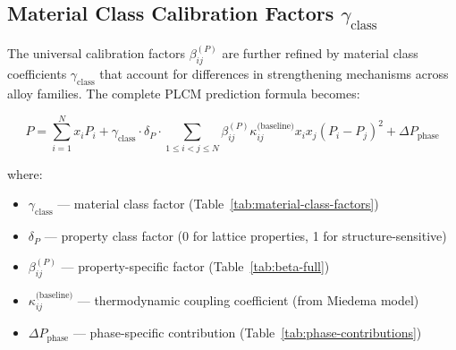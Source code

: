 \documentclass[12pt,a4paper]{article}
\begin{document}
	\subsection{Material Class Calibration Factors \(\gamma_{\text{class}}\)}
	\label{subsec:material-class-factors}
	
	The universal calibration factors \(\beta_{ij}^{(P)}\) are further refined by material class coefficients \(\gamma_{\text{class}}\) that account for differences in strengthening mechanisms across alloy families. The complete PLCM prediction formula becomes:
	
	\begin{equation}
		\boxed{P = \sum_{i=1}^{N} x_i P_i + \gamma_{\text{class}} \cdot \delta_P \cdot \sum_{1\le i<j\le N} \beta_{ij}^{(P)} \kappa_{ij}^{\text{(baseline)}} x_i x_j (P_i - P_j)^2 + \Delta P_{\text{phase}}}
		\label{eq:plcm-full-calibration}
	\end{equation}
	
	where:
	\begin{itemize}
		\item \(\gamma_{\text{class}}\) — material class factor (Table~\ref{tab:material-class-factors})
		\item \(\delta_P\) — property class factor (0 for lattice properties, 1 for structure-sensitive)
		\item \(\beta_{ij}^{(P)}\) — property-specific factor (Table~\ref{tab:beta-full})
		\item \(\kappa_{ij}^{\text{(baseline)}}\) — thermodynamic coupling coefficient (from Miedema model)
		\item \(\Delta P_{\text{phase}}\) — phase-specific contribution (Table~\ref{tab:phase-contributions})
	\end{itemize}
	
\end{document}
